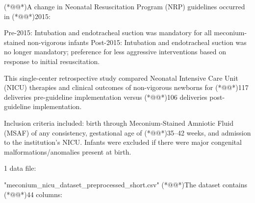 \documentclass[11pt]{article}
\begin{document}
\begin{codeoutput}
(*@@*)A change in Neonatal Resuscitation Program (NRP) guidelines occurred in (*@@*)2015:

Pre-2015: Intubation and endotracheal suction was mandatory for all meconium-stained non-vigorous infants
Post-2015: Intubation and endotracheal suction was no longer mandatory; preference for less aggressive interventions based on response to initial resuscitation.

This single-center retrospective study compared Neonatal Intensive Care Unit (NICU) therapies and clinical outcomes of non-vigorous newborns for (*@@*)117 deliveries pre-guideline implementation versus (*@@*)106 deliveries post-guideline implementation.

Inclusion criteria included: birth through Meconium-Stained Amniotic Fluid (MSAF) of any consistency, gestational age of (*@@*)35--42 weeks, and admission to the institution's NICU. Infants were excluded if there were major congenital malformations/anomalies present at birth.


1 data file:

"meconium\_nicu\_dataset\_preprocessed\_short.csv"
(*@@*)The dataset contains (*@@*)44 columns:


\end{codeoutput}
\end{document}
